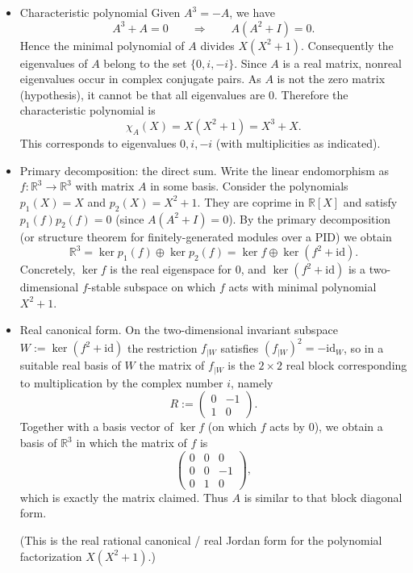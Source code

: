 \documentclass[12pt]{article}
\begin{document}
\begin{answerbox}
\begin{itemize}
    \item Characteristic polynomial
Given $A^3=-A$, we have
\[A^3+A=0\qquad\Longrightarrow\qquad A(A^2+I)=0.
\]
Hence the minimal polynomial of $A$ divides $X(X^2+1)$. Consequently the eigenvalues of $A$ belong to the set $\{0,i,-i\}$. Since $A$ is a real matrix, nonreal eigenvalues occur in complex conjugate pairs. As $A$ is not the zero matrix (hypothesis), it cannot be that all eigenvalues are $0$. Therefore the characteristic polynomial is
\[\chi_A(X)=X(X^2+1)=X^3+X.\]
This corresponds to eigenvalues $0,i,-i$ (with multiplicities as indicated).


    \item Primary decomposition: the direct sum.
Write the linear endomorphism as $f:\mathbb{R}^3\to\mathbb{R}^3$ with matrix $A$ in some basis. Consider the polynomials $p_1(X)=X$ and $p_2(X)=X^2+1$. They are coprime in $\mathbb{R}[X]$ and satisfy $p_1(f)p_2(f)=0$ (since $A(A^2+I)=0$). By the primary decomposition (or structure theorem for finitely-generated modules over a PID) we obtain
\[\mathbb{R}^3=\ker p_1(f)\oplus\ker p_2(f)=\ker f\oplus\ker(f^2+\mathrm{id}).\]
Concretely, $\ker f$ is the real eigenspace for $0$, and $\ker(f^2+\mathrm{id})$ is a two-dimensional $f$-stable subspace on which $f$ acts with minimal polynomial $X^2+1$.


    \item Real canonical form.
On the two-dimensional invariant subspace $W:=\ker(f^2+\mathrm{id})$ the restriction $f_{|W}$ satisfies $(f_{|W})^2=-\mathrm{id}_W$, so in a suitable real basis of $W$ the matrix of $f_{|W}$ is the $2\times2$ real block corresponding to multiplication by the complex number $i$, namely
\[R:=\begin{pmatrix}0 & -1\\ 1 & 0\end{pmatrix}.\]
Together with a basis vector of $\ker f$ (on which $f$ acts by $0$), we obtain a basis of $\mathbb{R}^3$ in which the matrix of $f$ is
\[\begin{pmatrix}0 & 0 & 0\\ 0 & 0 & -1\\ 0 & 1 & 0\end{pmatrix},\]
which is exactly the matrix claimed. Thus $A$ is similar to that block diagonal form.


(This is the real rational canonical / real Jordan form for the polynomial factorization $X(X^2+1)$.)
\end{itemize}
\end{answerbox}

\end{document}
